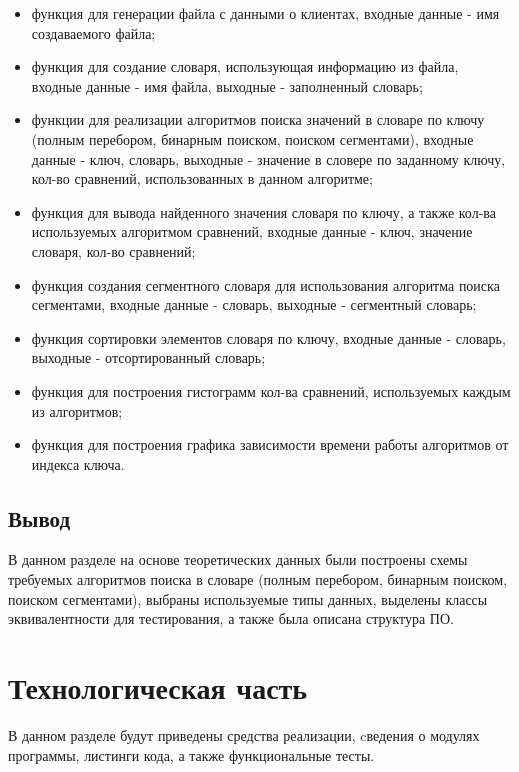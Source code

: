 \documentclass[a4paper,14pt, unknownkeysallowed]{extreport}
\begin{document}
\begin{itemize}
	\item функция для генерации файла с данными о клиентах, входные данные - имя создаваемого файла;
    \item функция для создание словаря, использующая информацию из файла, входные данные - имя файла, выходные - заполненный словарь;
    \item функции для реализации алгоритмов поиска значений в словаре по ключу (полным перебором, бинарным поиском, поиском сегментами), входные данные - ключ, словарь, выходные - значение в словере по заданному ключу, кол-во сравнений, использованных в данном алгоритме;
    \item функция для вывода найденного значения словаря по ключу, а также кол-ва используемых алгоритмом сравнений, входные данные - ключ, значение словаря, кол-во сравнений;
    \item функция создания сегментного словаря для использования алгоритма поиска сегментами, входные данные - словарь, выходные - сегментный словарь;
    \item функция сортировки элементов словаря по ключу, входные данные - словарь, выходные - отсортированный словарь;
    \item функция для построения гистограмм кол-ва сравнений, используемых каждым из алгоритмов;
    \item функция для построения графика зависимости времени работы алгоритмов от индекса ключа.
\end{itemize}

\section{Вывод}

В данном разделе на основе теоретических данных были построены схемы требуемых алгоритмов поиска в словаре (полным перебором, бинарным поиском, поиском сегментами), выбраны используемые типы данных, выделены классы эквивалентности для тестирования, а также была описана структура ПО.

\clearpage





\chapter{Технологическая часть}

В данном разделе будут приведены средства реализации, cведения о модулях программы, листинги кода, а также функциональные тесты.
\end{document}
